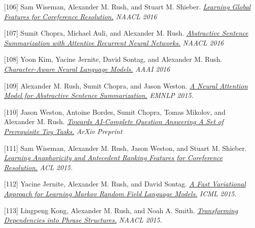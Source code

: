 \documentclass[10pt]{article}
\begin{document}
\medskip


[106] \ind Sam Wiseman, Alexander M. Rush, and Stuart M. Shieber. \emph{\href{ /papers/corefmain.pdf }{ Learning Global Features for Coreference Resolution.} }\emph{ NAACL 2016 }

\medskip


[107] \ind Sumit Chopra, Michael Auli, and Alexander M. Rush. \emph{\href{ /papers/naacl16_summary.pdf }{ Abstractive Sentence Summarization with Attentive Recurrent Neural Networks.} }\emph{ NAACL 2016 }

\medskip


[108] \ind Yoon Kim, Yacine Jernite, David Sontag, and Alexander M. Rush. \emph{\href{ https://arxiv.org/pdf/1508.06615v4 }{ Character-Aware Neural Language Models.} }\emph{ AAAI 2016 }

\medskip


[109] \ind Alexander M. Rush, Sumit Chopra, and Jason Weston. \emph{\href{ http://arxiv.org/pdf/1509.00685.pdf }{ A Neural Attention Model for Abstractive Sentence Summarization.} }\emph{ EMNLP 2015. }

\medskip


[110] \ind Jason Weston, Antoine Bordes, Sumit Chopra, Tomas Mikolov, and Alexander M. Rush. \emph{\href{ http://arxiv.org/pdf/1502.05698.pdf }{ Towards AI-Complete Question Answering A Set of Prerequisite Toy Tasks.} }\emph{ ArXiv Preprint }

\medskip


[111] \ind Sam Wiseman, Alexander M. Rush, Jason Weston, and Stuart M. Shieber. \emph{\href{ http://people.seas.harvard.edu/~srush/acl15.pdf }{ Learning Anaphoricity and Antecedent Ranking Features for Coreference Resolution.} }\emph{ ACL 2015. }

\medskip


[112] \ind Yacine Jernite, Alexander M. Rush, and David Sontag. \emph{\href{ http://people.seas.harvard.edu/~srush/icml15.pdf }{ A Fast Variational Approach for Learning Markov Random Field Language Models.} }\emph{ ICML 2015. }

\medskip


[113] \ind Lingpeng Kong, Alexander M. Rush, and Noah A. Smith. \emph{\href{ http://people.seas.harvard.edu/~srush/naacl15.pdf }{ Transforming Dependencies into Phrase Structures.} }\emph{ NAACL 2015. }

\medskip





\vspace{0.3in}
\end{document}
